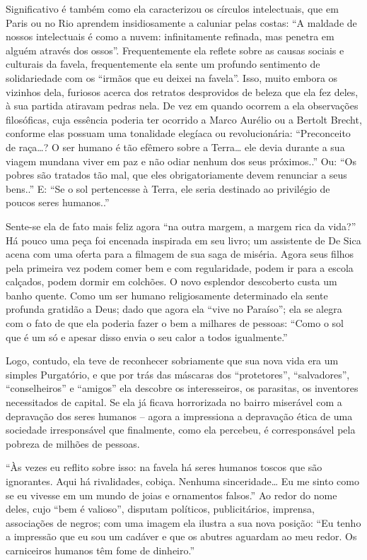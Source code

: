 \documentclass[
  letterpaper,
  DIV=11,
  numbers=noendperiod]{scrreprt}
\begin{document}
Significativo é também como ela caracterizou os círculos intelectuais,
que em Paris ou no Rio aprendem insidiosamente a caluniar pelas costas:
``A maldade de nossos intelectuais é como a nuvem: infinitamente
refinada, mas penetra em alguém através dos ossos''. Frequentemente ela
reflete sobre as causas sociais e culturais da favela, frequentemente
ela sente um profundo sentimento de solidariedade com os ``irmãos que eu
deixei na favela''. Isso, muito embora os vizinhos dela, furiosos acerca
dos retratos desprovidos de beleza que ela fez deles, à sua partida
atiravam pedras nela. De vez em quando ocorrem a ela observações
filosóficas, cuja essência poderia ter ocorrido a Marco Aurélio ou a
Bertolt Brecht, conforme elas possuam uma tonalidade elegíaca ou
revolucionária: ``Preconceito de raça\ldots? O ser humano é tão efêmero
sobre a Terra\ldots{} ele devia durante a sua viagem mundana viver em
paz e não odiar nenhum dos seus próximos..'' Ou: ``Os pobres são
tratados tão mal, que eles obrigatoriamente devem renunciar a seus
bens..'' E: ``Se o sol pertencesse à Terra, ele seria destinado ao
privilégio de poucos seres humanos..''

Sente-se ela de fato mais feliz agora ``na outra margem, a margem rica
da vida?'' Há pouco uma peça foi encenada inspirada em seu livro; um
assistente de De Sica acena com uma oferta para a filmagem de sua saga
de miséria. Agora seus filhos pela primeira vez podem comer bem e com
regularidade, podem ir para a escola calçados, podem dormir em colchões.
O novo esplendor descoberto custa um banho quente. Como um ser humano
religiosamente determinado ela sente profunda gratidão a Deus; dado que
agora ela ``vive no Paraíso''; ela se alegra com o fato de que ela
poderia fazer o bem a milhares de pessoas: ``Como o sol que é um só e
apesar disso envia o seu calor a todos igualmente.''

Logo, contudo, ela teve de reconhecer sobriamente que sua nova vida era
um simples Purgatório, e que por trás das máscaras dos ``protetores'',
``salvadores'', ``conselheiros'' e ``amigos'' ela descobre os
interesseiros, os parasitas, os inventores necessitados de capital. Se
ela já ficava horrorizada no bairro miserável com a depravação dos seres
humanos -- agora a impressiona a depravação ética de uma sociedade
irresponsável que finalmente, como ela percebeu, é corresponsável pela
pobreza de milhões de pessoas.

``Às vezes eu reflito sobre isso: na favela há seres humanos toscos que
são ignorantes. Aqui há rivalidades, cobiça. Nenhuma sinceridade\ldots{}
Eu me sinto como se eu vivesse em um mundo de joias e ornamentos
falsos.'' Ao redor do nome deles, cujo ``bem é valioso'', disputam
políticos, publicitários, imprensa, associações de negros; com uma
imagem ela ilustra a sua nova posição: ``Eu tenho a impressão que eu sou
um cadáver e que os abutres aguardam ao meu redor. Os carniceiros
humanos têm fome de dinheiro.''
\end{document}
